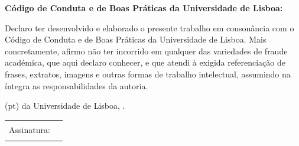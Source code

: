 
%

\thispagestyle{empty}

\begin{center}
  \textbf{Código de Conduta e de Boas Práticas da Universidade de Lisboa:}
\end{center}

\bigskip

\noindent
Declaro ter desenvolvido e elaborado o presente trabalho em consonância com
o Código de Conduta e de Boas Práticas da Universidade de Lisboa. Mais
concretamente, afirmo não ter incorrido em qualquer das variedades de
fraude académica, que aqui declaro conhecer, e que atendi à exigida
referenciação de frases, extratos, imagens e outras formas de trabalho
intelectual, assumindo na íntegra as responsabilidades da autoria.

\vfill

\noindent
\GetSchool(pt) da Universidade de Lisboa,
.\par
\bigskip
\begin{tabularx}{\linewidth}{@{}lX@{}}
Assinatura: & \rule{\linewidth}{0.75pt}
\end{tabularx}
